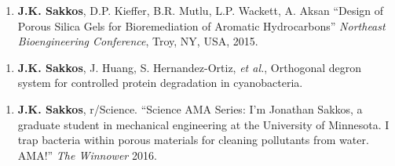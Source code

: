 \begin{cvparagraph}
\begin{enumerate}
		
\item {\textbf{J.K. Sakkos}, D.P. Kieffer, B.R. Mutlu, L.P. Wackett, A. Aksan “Design of Porous Silica Gels for Bioremediation of Aromatic Hydrocarbons” \textit{Northeast Bioengineering Conference}, Troy, NY, USA, 2015.}
\end{enumerate}
\end{cvparagraph}
\begin{cvparagraph}
\begin{enumerate}
		\item{\textbf{J.K. Sakkos}, J. Huang, S. Hernandez-Ortiz, \textit{et al.}, Orthogonal degron system for controlled protein degradation in cyanobacteria.}

\end{enumerate}
\end{cvparagraph}
\begin{cvparagraph}
\begin{enumerate}
	\item {\textbf{J.K. Sakkos}, r/Science. “Science AMA Series: I’m Jonathan Sakkos, a graduate student in mechanical engineering at the University of Minnesota. I trap bacteria within porous materials for cleaning pollutants from water. AMA!” \textit{The Winnower} 2016.}
\end{enumerate}
\end{cvparagraph}